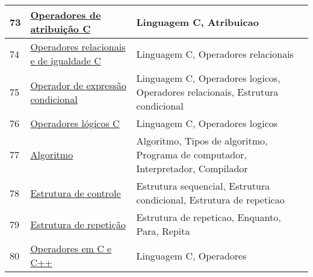\begin{longtable}{| p{} | p{} | p{} |}
73  & \href{https://msdn.microsoft.com/pt-br/library/474dd6e2.aspx}{\color{blue} Operadores de atribuição C                                                          } & Linguagem C, Atribuicao                                                                                                                           \\ \hline
74  & \href{https://msdn.microsoft.com/pt-br/library/6swh93dx.aspx}{\color{blue} Operadores relacionais e de igualdade C                                             } & Linguagem C, Operadores relacionais                                                                                                               \\ \hline
75  & \href{https://msdn.microsoft.com/pt-br/library/exefbdtf.aspx}{\color{blue} Operador de expressão condicional                                                   } & Linguagem C, Operadores logicos, Operadores relacionais, Estrutura condicional                                                                    \\ \hline
76  & \href{https://msdn.microsoft.com/pt-br/library/z68fx2f1.aspx}{\color{blue} Operadores lógicos C                                                                } & Linguagem C, Operadores logicos                                                                                                                   \\ \hline
77  & \href{https://pt.wikipedia.org/wiki/Algoritmo}{\color{blue} Algoritmo                                                                           } & Algoritmo, Tipos de algoritmo, Programa de computador, Interpretador, Compilador                                                                  \\ \hline
78  & \href{https://pt.wikipedia.org/wiki/Estrutura\_de\_controle}{\color{blue} Estrutura de controle                                                               } & Estrutura sequencial, Estrutura condicional, Estrutura de repeticao                                                                               \\ \hline
79  & \href{https://pt.wikipedia.org/wiki/Estrutura\_de\_repeti\%C3\%A7\%C3\%A3o}{\color{blue} Estrutura de repetição                                                              } & Estrutura de repeticao, Enquanto, Para, Repita                                                                                                    \\ \hline
80  & \href{https://pt.wikipedia.org/wiki/Operadores\_em\_C\_e\_C\%2B\%2B}{\color{blue} Operadores em C e C++                                                               } & Linguagem C, Operadores                                                                                                                           \\ \hline

\end{longtable}
